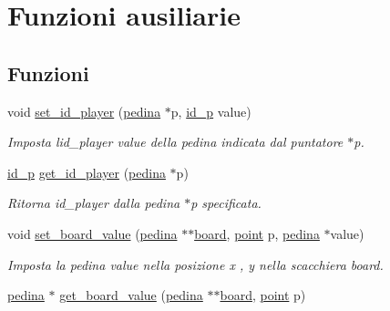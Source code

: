 \hypertarget{group__Ausiliarie}{}\section{Funzioni ausiliarie}
\label{group__Ausiliarie}
\subsection*{Funzioni}
\begin{DoxyCompactItemize}
\item 
void \hyperlink{group__Ausiliarie_gabbdcb7fca0fe313ecc63bc2ba1a73d8e}{set\+\_\+id\+\_\+player} (\hyperlink{ml__lib_8h_a71fee95122b31f5cb0b07d9c16ffa3a5}{pedina} $\ast$p, \hyperlink{ml__lib_8h_a0330ff92cbc796e96c3ce3e4401bf1e1}{id\+\_\+p} value)
\begin{DoxyCompactList}\small\item\em Imposta l\textquotesingle{}id\+\_\+player {\itshape value} della pedina indicata dal puntatore {\itshape $\ast$p}. \end{DoxyCompactList}\item 
\hyperlink{ml__lib_8h_a0330ff92cbc796e96c3ce3e4401bf1e1}{id\+\_\+p} \hyperlink{group__Ausiliarie_gaeebe06189e2bd221a0e65b7d15f6b1b5}{get\+\_\+id\+\_\+player} (\hyperlink{ml__lib_8h_a71fee95122b31f5cb0b07d9c16ffa3a5}{pedina} $\ast$p)
\begin{DoxyCompactList}\small\item\em Ritorna {\itshape id\+\_\+player} dalla pedina {\itshape $\ast$p} specificata. \end{DoxyCompactList}\item 
void \hyperlink{group__Ausiliarie_ga39c663b743546e37a5bbb2f9d1adfd2b}{set\+\_\+board\+\_\+value} (\hyperlink{ml__lib_8h_a71fee95122b31f5cb0b07d9c16ffa3a5}{pedina} $\ast$$\ast$\hyperlink{ml__main_8c_a62a3fe3d1df9ff58883b669f7f24e516}{board}, \hyperlink{structpunto}{point} p, \hyperlink{ml__lib_8h_a71fee95122b31f5cb0b07d9c16ffa3a5}{pedina} $\ast$value)
\begin{DoxyCompactList}\small\item\em Imposta la pedina {\itshape value} nella posizione {\itshape x} , {\itshape y} nella scacchiera {\itshape board}. \end{DoxyCompactList}\item 
\hyperlink{ml__lib_8h_a71fee95122b31f5cb0b07d9c16ffa3a5}{pedina} $\ast$ \hyperlink{group__Ausiliarie_gacbcceb01143b3098ac3ee65642d94a35}{get\+\_\+board\+\_\+value} (\hyperlink{ml__lib_8h_a71fee95122b31f5cb0b07d9c16ffa3a5}{pedina} $\ast$$\ast$\hyperlink{ml__main_8c_a62a3fe3d1df9ff58883b669f7f24e516}{board}, \hyperlink{structpunto}{point} p)

\end{DoxyCompactItemize}
